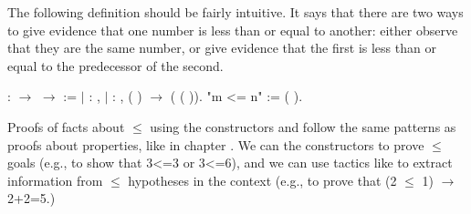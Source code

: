 \documentclass[12pt]{report}
\begin{document}
 The following definition should be fairly intuitive.  It
    says that there are two ways to give evidence that one number is
    less than or equal to another: either observe that they are the
    same number, or give evidence that the first is less than or equal
    to the predecessor of the second. \begin{coqdoccode}
\coqdocemptyline
\coqdocnoindent
{}  :  \ensuremath{\rightarrow}  \ensuremath{\rightarrow}  :=\coqdoceol
\coqdocindent{1.00em}
\ensuremath{|}  : \coqdockw{\ensuremath{\forall}} ,   \coqdoceol
\coqdocindent{1.00em}
\ensuremath{|}  : \coqdockw{\ensuremath{\forall}}  , (  ) \ensuremath{\rightarrow} (  ( )).\coqdoceol
\coqdocemptyline
\coqdocnoindent
{} "m <= n" := (  ).\coqdoceol
\coqdocemptyline
\end{coqdoccode}
Proofs of facts about \ensuremath{\le} using the constructors  and
     follow the same patterns as proofs about properties, like
     in chapter .  We can  the constructors to prove \ensuremath{\le}
    goals (e.g., to show that 3<=3 or 3<=6), and we can use
    tactics like  to extract information from \ensuremath{\le}
    hypotheses in the context (e.g., to prove that (2 \ensuremath{\le} 1) \ensuremath{\rightarrow} 2+2=5.) 

\subsubsection{ }
\end{document}
